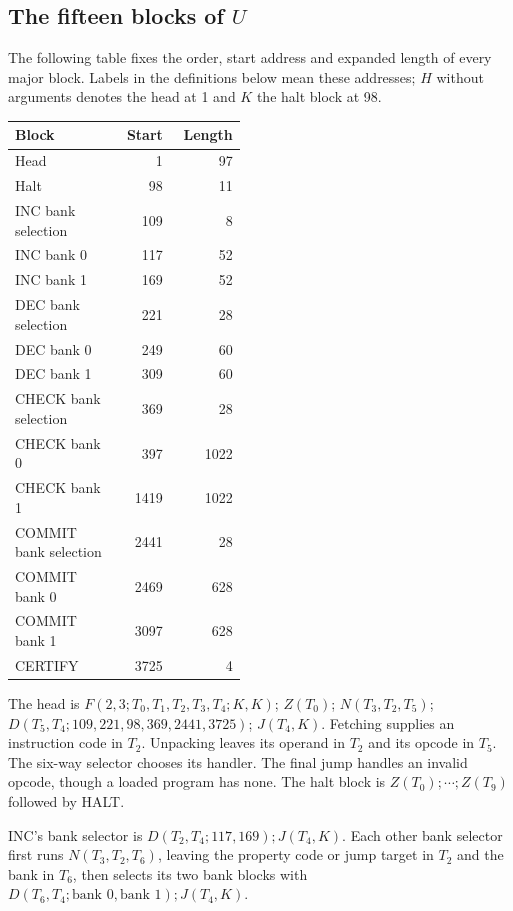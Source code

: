 \documentclass[11pt,twoside]{article}
\theoremstyle{thielethm}
\theoremstyle{thieledef}
\theoremstyle{thieledef}
\theoremstyle{thieledef}
\theoremstyle{thielethm}
\theoremstyle{thieleobs}
\theoremstyle{thielethm}
\begin{document}
\subsection{The fifteen blocks of \texorpdfstring{$U$}{U}}

The following table fixes the order, start address and expanded length of every major
block. Labels in the definitions below mean these addresses; $H$ without arguments denotes the head at 1
and $K$ the halt block at 98.

\begingroup\small
\begin{longtable}{@{}>{\raggedright\arraybackslash}p{0.46\linewidth}rr@{}}
\toprule
Block & Start & Length \\
\midrule\endhead
Head & 1 & 97 \\
Halt & 98 & 11 \\
INC bank selection & 109 & 8 \\
INC bank 0 & 117 & 52 \\
INC bank 1 & 169 & 52 \\
DEC bank selection & 221 & 28 \\
DEC bank 0 & 249 & 60 \\
DEC bank 1 & 309 & 60 \\
CHECK bank selection & 369 & 28 \\
CHECK bank 0 & 397 & 1022 \\
CHECK bank 1 & 1419 & 1022 \\
COMMIT bank selection & 2441 & 28 \\
COMMIT bank 0 & 2469 & 628 \\
COMMIT bank 1 & 3097 & 628 \\
CERTIFY & 3725 & 4 \\
\bottomrule
\end{longtable}
\endgroup

The head is
$F(2,3;T_0,T_1,T_2,T_3,T_4;K,K)$;
$Z(T_0)$; $N(T_3,T_2,T_5)$;
$D(T_5,T_4;109,\allowbreak 221,\allowbreak 98,\allowbreak 369,\allowbreak 2441,\allowbreak 3725)$; $J(T_4,K)$.
Fetching supplies an instruction code in $T_2$. Unpacking leaves its operand in $T_2$
and its opcode in $T_5$. The six-way selector chooses its handler. The final jump
handles an invalid opcode, though a loaded program has none.
The halt block is $Z(T_0);\cdots;Z(T_9)$ followed by HALT.

INC's bank selector is $D(T_2,T_4;117,169);J(T_4,K)$.
Each other bank selector first runs $N(T_3,T_2,T_6)$, leaving the property code or
jump target in $T_2$ and the bank in $T_6$, then selects its two bank blocks with
$D(T_6,T_4;\text{bank 0},\text{bank 1});J(T_4,K)$.
\end{document}
